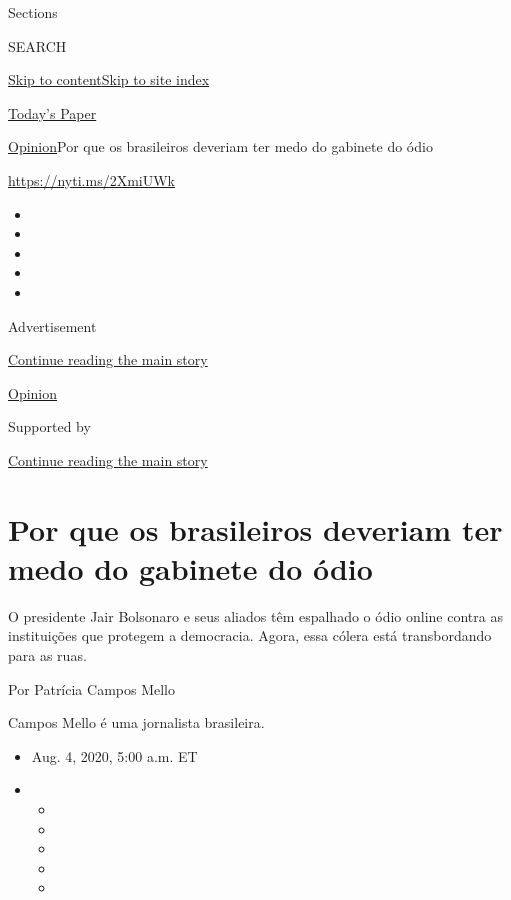 Sections

SEARCH

\protect\hyperlink{site-content}{Skip to
content}\protect\hyperlink{site-index}{Skip to site index}

\href{https://myaccount.nytimes.com/auth/login?response_type=cookie\&client_id=vi}{}

\href{https://www.nytimes.com/section/todayspaper}{Today's Paper}

\href{/section/opinion}{Opinion}\textbar{}Por que os brasileiros
deveriam ter medo do gabinete do ódio

\url{https://nyti.ms/2XmiUWk}

\begin{itemize}
\item
\item
\item
\item
\item
\end{itemize}

Advertisement

\protect\hyperlink{after-top}{Continue reading the main story}

\href{/section/opinion}{Opinion}

Supported by

\protect\hyperlink{after-sponsor}{Continue reading the main story}

\hypertarget{por-que-os-brasileiros-deveriam-ter-medo-do-gabinete-do-uxf3dio}{%
\section{Por que os brasileiros deveriam ter medo do gabinete do
ódio}\label{por-que-os-brasileiros-deveriam-ter-medo-do-gabinete-do-uxf3dio}}

O presidente Jair Bolsonaro e seus aliados têm espalhado o ódio online
contra as instituições que protegem a democracia. Agora, essa cólera
está transbordando para as ruas.

Por Patrícia Campos Mello

Campos Mello é uma jornalista brasileira.

\begin{itemize}
\item
  Aug. 4, 2020, 5:00 a.m. ET
\item
  \begin{itemize}
  \item
  \item
  \item
  \item
  \item
  \end{itemize}
\end{itemize}


